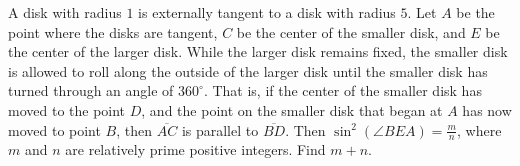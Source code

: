 A disk with radius $1$ is externally tangent to a disk with radius $5$. Let $A$ be the point where the disks are tangent, $C$ be the center of the smaller disk, and $E$ be the center of the larger disk. While the larger disk remains fixed, the smaller disk is allowed to roll along the outside of the larger disk until the smaller disk has turned through an angle of $360^\circ$. That is, if the center of the smaller disk has moved to the point $D$, and the point on the smaller disk that began at $A$ has now moved to point $B$, then $\overline{AC}$ is parallel to $\overline{BD}$. Then $\sin^2(\angle BEA)=\tfrac{m}{n}$, where $m$ and $n$ are relatively prime positive integers. Find $m+n$.